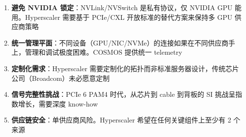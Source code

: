 \begin{enumerate}
    \item \textbf{避免 NVIDIA 锁定}：NVLink/NVSwitch 是私有协议，仅 NVIDIA GPU 能用。Hyperscaler 需要基于 PCIe/CXL 开放标准的替代方案来保持多 GPU 供应商策略
    \item \textbf{统一管理平面}：不同设备（GPU/NIC/NVMe）的连接如果在不同供应商手上，管理和调试极度困难。COSMOS 提供统一 telemetry
    \item \textbf{定制化需求}：Hyperscaler 需要定制化的拓扑而非标准服务器设计，传统芯片公司（Broadcom）未必愿意定制
    \item \textbf{信号完整性挑战}：PCIe 6 PAM4 时代，从芯片到 cable 到背板的 SI 挑战呈指数增长，需要深度 know-how
    \item \textbf{供应链安全}：单供应商风险。Hyperscaler 希望在任何关键组件上至少有 2 个来源
\end{enumerate}

